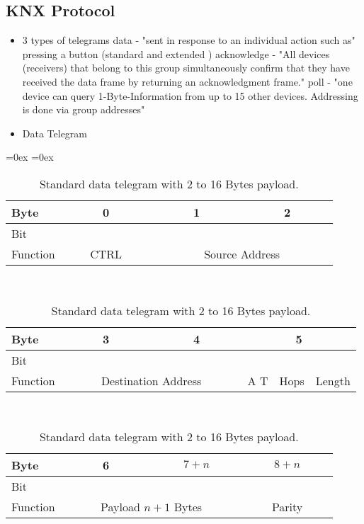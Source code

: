 	\subsection{KNX Protocol}
		\begin{itemize}
			\item 3 types of telegrams \parencite{Hubner2009} \parencite{Merz2009}
				\subitem data - "sent in response to an individual action such as" \parencite{Merz2009} pressing a button (standard and extended \parencite{Hubner2009})
				\subitem acknowledge - "All devices (receivers) that belong to this group simultaneously confirm that they have received the data frame by returning an acknowledgment frame." \parencite{Merz2009}
				\subitem poll - "one device can query 1-Byte-Information from up to 15 other devices. Addressing is done via group addresses" \parencite{Hubner2009}
			\item Data Telegram
				\subitem 
			
		\end{itemize}
	
		\begin{table}
			\aboverulesep=0ex
			\belowrulesep=0ex
			\renewcommand{\arraystretch}{1.2}
			
			\centering
			\begin{tabular}{|l|c|c|c|c|c|c|c|c|c|c|c|c|c|c|c|c|c|c|c|c|c|c|c|c|}
				\toprule
				Byte & \multicolumn{8}{c|}{0} & \multicolumn{8}{c|}{1} & \multicolumn{8}{c|}{2} \\\midrule
				Bit & & & & & & & & & & & & & & & & & & & & & & & & \\\midrule
				Function & \multicolumn{8}{c|}{CTRL} & \multicolumn{16}{c|}{Source Address} \\\midrule
			\end{tabular}
			\\
			\begin{tabular}{|l|c|c|c|c|c|c|c|c|c|c|c|c|c|c|c|c|c|c|c|c|c|c|c|c|}
				\toprule
				Byte & \multicolumn{8}{c|}{3} & \multicolumn{8}{c|}{4} & \multicolumn{8}{c|}{5} \\\midrule
				Bit & & & & & & & & & & & & & & & & & & & & & & & & \\\midrule
				Function & \multicolumn{16}{c|}{Destination Address} & \multicolumn{1}{c|}{\parbox[t][][t]{0.1cm}{A T}} & \multicolumn{3}{c|}{Hops} & \multicolumn{4}{c|}{Length} \\\midrule
			\end{tabular}
			\\
			\begin{tabular}{|l|c|c|c|c|c|c|c|c|c|c|c|c|c|c|c|c|c|c|c|c|c|c|c|c|}
				\toprule
				Byte & \multicolumn{8}{c|}{6} & \multicolumn{8}{c|}{$7+n$} & \multicolumn{8}{c|}{$8+n$} \\\midrule
				Bit & & & & & & & & & & & & & & & & & & & & & & & & \\\midrule
				Function & \multicolumn{16}{c|}{Payload $n+1$ Bytes} & \multicolumn{8}{c|}{Parity} \\\midrule
			\end{tabular}
			\caption[Standard \knx data telegram]{Standard \knx data telegram with $2$ to 16 Bytes payload.}
			\label{tab:background:bas:knx:proto:knx-standard}
		\end{table}
	
